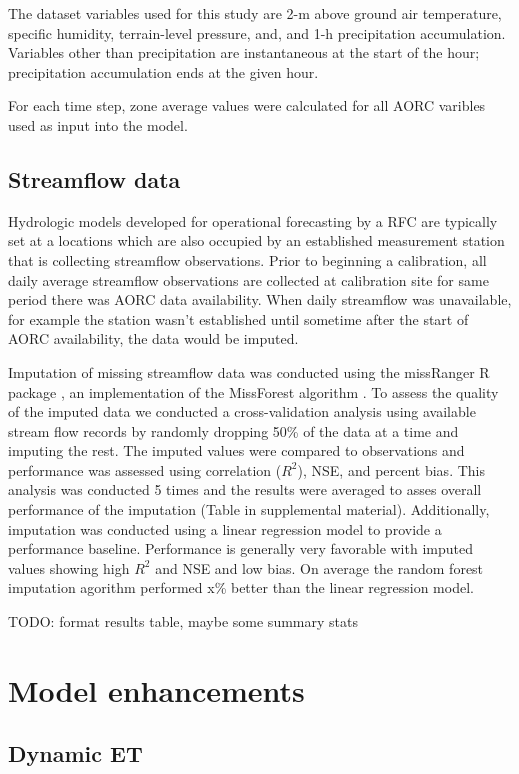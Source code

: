 \documentclass{agujournal2019}
\begin{document}
The dataset variables used for this study are 2-m above ground air temperature, specific humidity, terrain-level pressure, and, and 1-h precipitation accumulation. Variables other than precipitation are instantaneous at the start of the hour; precipitation accumulation ends at the given hour. 

For each time step, zone average values were calculated for all AORC varibles used as input into the model. 

\subsection{Streamflow data}

Hydrologic models developed for operational forecasting by a RFC are typically set at a locations which are also occupied  by an established measurement station that is collecting streamflow observations. Prior to beginning a calibration, all daily average streamflow observations are collected at calibration site for same period there was AORC data availability. When daily streamflow was unavailable, for example the station wasn't established until sometime after the start of AORC availability, the data would be imputed. 

Imputation of missing streamflow data was conducted using the missRanger R package \cite{Mayer2024}, an implementation of the MissForest algorithm \cite{Stekhoven_2011}. To assess the quality of the imputed data we conducted a cross-validation analysis using available stream flow records by randomly dropping 50\% of the data at a time and imputing the rest. The imputed values were compared to observations and performance was assessed using correlation ($R^2$), NSE, and percent bias. This analysis was conducted 5 times and the results were averaged to asses overall performance of the imputation (Table in supplemental material). Additionally, imputation was conducted using a linear regression model to provide a performance baseline. Performance is generally very favorable with imputed values showing high $R^2$ and NSE and low bias. On average the random forest imputation agorithm performed x\% better than the linear regression model. 


TODO: format results table, maybe some summary stats 

\section{Model enhancements}

\subsection{Dynamic ET}
\end{document}
